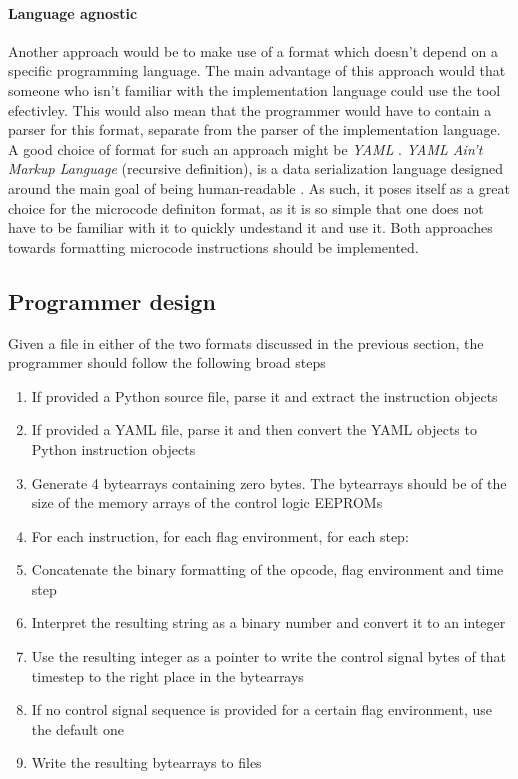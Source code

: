 \paragraph{Language agnostic} Another approach would be to make use of a format
which doesn't depend on a specific programming language. The main advantage of this
approach would that someone who isn't familiar with the implementation language
could use the tool efectivley. This would also mean that the programmer would
have to contain a parser for this format, separate from the parser of the implementation
language. A good choice of format for such an approach might be \emph{YAML} \cite{yaml}.
\emph{YAML Ain't Markup Language} (recursive definition), is a data serialization language
designed around the main goal of being human-readable \cite{yaml}. As such, it poses itself
as a great choice for the microcode definiton format, as it is so simple that one
does not have to be familiar with it to quickly undestand it and use it. Both approaches
towards formatting microcode instructions should be implemented.

\subsection{Programmer design}
Given a file in either of the two formats discussed in the previous section, the programmer
should follow the following broad steps
\begin{enumerate}
  \item If provided a Python source file, parse it and extract the instruction objects
  \item If provided a YAML file, parse it and then convert the YAML objects to Python instruction
  objects
  \item Generate 4 bytearrays containing zero bytes. The bytearrays should be of the size of the
  memory arrays of the control logic EEPROMs
  \item For each instruction, for each flag environment, for each step:
  \item Concatenate the binary formatting of the opcode, flag environment and time step
  \item Interpret the resulting string as a binary number and convert it to an integer
  \item Use the resulting integer as a pointer to write
  the control signal bytes of that timestep to the right place in the bytearrays
  \item If no control signal sequence is provided for a certain flag environment, use the default
  one
  \item Write the resulting bytearrays to files
\end{enumerate}


